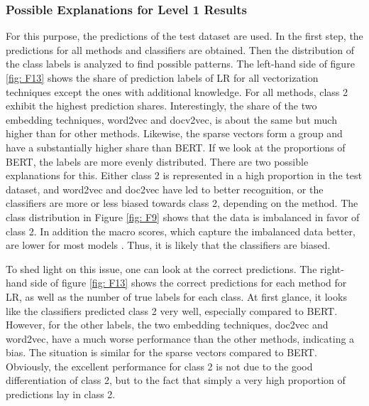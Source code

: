 \documentclass[12pt, a4paper, titlepage]{article}
\begin{document}
\subsubsection*{Possible Explanations for Level 1 Results}
For this purpose, the predictions of the test dataset are used. In the first step, the predictions for all methods and classifiers are obtained. Then the distribution of the class labels is analyzed to find possible patterns. The left-hand side of figure \ref{fig: F13} shows the share of prediction labels of \ac{LR} for all vectorization techniques except the ones with additional knowledge. For all methods, class 2 exhibit the highest prediction shares. 
Interestingly, the share of the two embedding techniques, word2vec and docv2vec, is about the same but much higher than for other methods. Likewise, the sparse vectors form a group and have a substantially higher share than \ac{BERT}. If we look at the proportions of \ac{BERT}, the labels are more evenly distributed. There are two possible explanations for this. Either class 2 is represented in a high proportion in the test dataset, and word2vec and doc2vec have led to better recognition, or the classifiers are more or less biased towards class 2, depending on the method. The class distribution in Figure \ref{fig: F9} shows that the data is imbalanced in favor of class 2. In addition the macro scores, which capture the imbalanced data better, are lower for most models . Thus, it is likely that the classifiers are biased. 

To shed light on this issue, one can look at the correct predictions. The right-hand side of figure \ref{fig: F13} shows the correct predictions for each method for \ac{LR}, as well as the number of true labels for each class. At first glance, it looks like the classifiers predicted class 2 very well, especially compared to \ac{BERT}. However, for the other labels, the two embedding techniques, doc2vec and word2vec, have a much worse performance than the other methods, indicating a bias. The situation is similar for the sparse vectors compared to BERT. Obviously, the excellent performance for class 2 is not due to the good differentiation of class 2, but to the fact that simply a very high proportion of predictions lay in class 2. 
\end{document}
